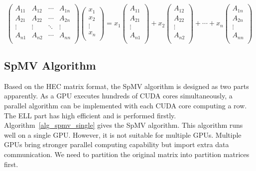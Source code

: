\documentclass[runningheads,a4paper]{llncs}
\begin{document}
{\begin{equation}
\label{equ_spmv_c}
\left(
  \begin{array}{cccc}
    A_{11}  &A_{12}  &\cdots  &A_{1n}\\
    A_{21}  &A_{22}  &\cdots  &A_{2n}\\
    \vdots  &\vdots  &\ddots  &\vdots\\
    A_{n1}  &A_{n2}  &\cdots  &A_{nn}\\
  \end{array}
\right)
\left(
  \begin{array}{c}
    x_1\\
    x_2\\
    \vdots\\
    x_n\\
  \end{array}
\right)
=
x_1\left(
  \begin{array}{c}
    A_{11}\\
    A_{21}\\
    \vdots\\
    A_{n1}\\
  \end{array}
\right)
+
x_2\left(
  \begin{array}{c}
    A_{12}\\
    A_{22}\\
    \vdots\\
    A_{n2}\\
  \end{array}
\right)
+
\cdots
+
x_n\left(
  \begin{array}{c}
    A_{1n}\\
    A_{2n}\\
    \vdots\\
    A_{nn}\\
  \end{array}
\right)
\end{equation}


\subsection{SpMV Algorithm}
Based on the HEC matrix format, the SpMV algorithm is designed as two parts apparently. As a GPU executes hundreds of CUDA cores simultaneously, a parallel algorithm can be implemented with each CUDA core computing a row. The ELL part has high efficient and is performed firstly. Algorithm~\ref{alg_spmv_single} gives the SpMV algorithm. This algorithm runs well on a single GPU. However, it is not suitable for multiple GPUs. Multiple GPUs bring stronger parallel computing capability but import extra data communication. We need to partition the original matrix into partition matrices first.

}
\end{document}
